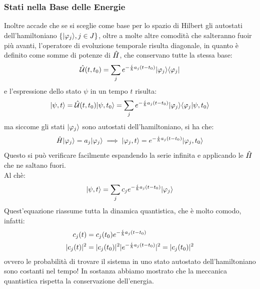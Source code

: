\subsubsection*{Stati nella Base delle Energie}
Inoltre accade che se si sceglie come base per lo spazio di Hilbert gli autostati dell'hamiltoniano $\{| \varphi_j \rangle, j \in J\}$, oltre a molte altre comodità che salteranno fuoir più avanti, l'operatore di evoluzione temporale risulta diagonale, in quanto è definito come somme di potenze di $\hat{H}$, che conservano tutte la stessa base:
\[
    \hat{\mathcal{U}}(t, t_0) = \sum_j e^{-\frac{i}{\hslash} a_j (t - t_0)} |\varphi_j \rangle \langle \varphi_j |
\]
e l'espressione dello stato $\psi$ in un tempo $t$ risulta:
\[
    |\psi, t\rangle = \hat{\mathcal{U}}(t, t_0) |\psi, t_0\rangle = \sum_j e^{-\frac{i}{\hslash} a_j (t - t_0)} |\varphi_j \rangle \langle \varphi_j | \psi, t_0\rangle
\]
ma siccome gli stati $|\varphi_j \rangle$ sono autostati dell'hamiltoniano, si ha che:
\begin{equation*}
    \hat H |\varphi_j \rangle = a_j |\varphi_j \rangle
    \implies |\varphi_j, t\rangle = e^{-\frac{i}{\hslash} a_j (t - t_0)} |\varphi_j, t_0\rangle
\end{equation*}
Questo si può verificare facilmente espandendo la serie infinita e applicando le $\hat{H}$ che ne saltano fuori.\\
Al chè:
\[
    |\psi, t\rangle = \sum_j c_j e^{-\frac{i}{\hslash} a_j (t - t_0)} |\varphi_j \rangle
\]
Quest'equazione riassume tutta la dinamica quantistica, che è molto comodo, infatti:
\begin{align*}
    c_j(t) &= c_j(t_0) e^{-\frac{i}{\hslash} a_j (t - t_0)} \\
    |c_j(t)|^2 &= |c_j(t_0)|^2|e^{-\frac{i}{\hslash} a_j (t - t_0)}|^2 = |c_j(t_0)|^2
\end{align*}
ovvero le probabilità di trovare il sistema in uno stato autostato dell'hamiltoniano sono costanti nel tempo! In sostanza abbiamo mostrato che la meccanica quantistica rispetta la conservazione dell'energia.
